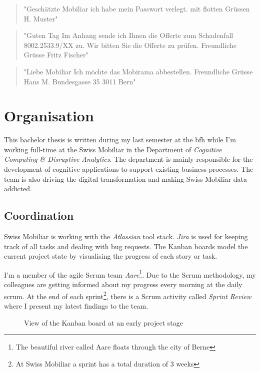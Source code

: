 \begin{quote}
    "Geschätzte Mobiliar ich habe mein Passwort verlegt. mit flotten Grüssen H. Muster"
\end{quote}

\begin{quote}
    "Guten Tag Im Anhang sende ich Ihnen die Offerte zum Schadenfall 8002.2533.9/XX zu. Wir bitten Sie die Offerte zu prüfen. Freundliche Grüsse Fritz Fischer"
\end{quote}

\begin{quote}
    "Liebe Mobiliar Ich möchte das Mobirama abbestellen. Freundliche Grüsse Hans M. Bundesgasse 35 3011 Bern"
\end{quote}

\section{Organisation}

This bachelor thesis is written during my last semester at the \acrlong{bfh} while I'm working full-time at the Swiss Mobiliar in
the Department of \emph{Cognitive Computing \& Disruptive Analytics}. The department is mainly responsible for the development of
cognitive applications to support existing business processes. The team is also driving the digital transformation and making
Swiss Mobiliar data addicted.

\subsection{Coordination}

Swiss Mobiliar is working with the \emph{Atlassian} tool stack. \emph{Jira} is used for keeping track of all tasks and dealing
with bug requests. The Kanban boards model the current project state by visualising the progress of each story or task.

I'm a member of the agile Scrum team \emph{Aare}\footnote{The beautiful river called Aare floats through the city of Berne}. Due
to the Scrum methodology, my colleagues are getting informed about my progress every morning at the daily scrum. At the end of each
sprint\footnote{At Swiss Mobiliar a sprint has a total duration of 3 weeks}, there is a Scrum activity called \emph{Sprint Review}
where I present my latest findings to the team.

\begin{figure}[!ht]
\centering
{}
\caption{View of the Kanban board at an early project stage}
\label{fig:kanban}
\end{figure}

